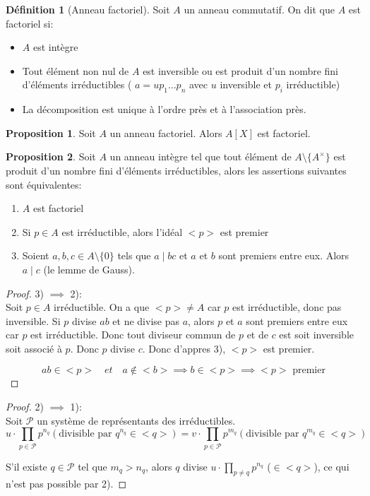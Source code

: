\documentclass{article}
\theoremstyle{definition}
\newtheorem{definition}{Définition}
\theoremstyle{definition}
\newtheorem{prop}{Proposition}
\theoremstyle{definition}
\theoremstyle{plain}
\theoremstyle{theorem}
\begin{document}
\begin{definition}[Anneau factoriel]
	Soit $A$ un anneau commutatif. On dit que $A$ est factoriel si:
	\begin{itemize}
		\item $A$ est intègre
		\item Tout élément non nul de $A$ est inversible ou est produit d'un nombre fini d'éléments irréductibles ( $a = u p_1 \dots p_n$ avec $u$ inversible et $p_i$ irréductible)
		\item La décomposition est unique à l'ordre près et à l'association près.
	\end{itemize}
\end{definition}

\begin{prop}
	Soit $A$ un anneau factoriel. Alors $A[X]$ est factoriel.
\end{prop}


\begin{prop}
	Soit $A$ un anneau intègre tel que tout élément de $A\setminus\{A^{\times}\}$ est produit d'un nombre fini d'éléments irréductibles, alors les assertions suivantes sont équivalentes:
	\begin{enumerate}
		\item $A$ est factoriel
		\item Si $p \in A$ est irréductible, alors l'idéal $<p>$ est premier
		\item Soient $a,b,c \in A\setminus\{0\}$ tels que $a \mid bc$ et $a$ et $b$ sont premiers entre eux. Alors $a \mid c$ (le lemme de Gauss).
	\end{enumerate}
\end{prop}

\begin{proof}

	3) $\implies$ 2):\\
	Soit $p \in A$ irréductible. On a que $<p> \neq A$ car $p$ est irréductible, donc pas inversible.
	Si $p$ divise $ab$ et ne divise pas $a$, alors $p$ et $a$ sont premiers entre eux car $p$ est irréductible.
	Donc tout diviseur commun de $p$ et de $c$ est soit inversible soit associé à $p$. Donc $p$ divise $c$.
	Donc d'appres 3), $<p>$ est premier.

	\[ ab \in <p>\quad  et \quad a \notin <b> \implies b \in <p> \implies <p> \text{ premier} \]

\end{proof}

\begin{proof}

    2) $\implies$ 1):\\
    Soit $\mathcal{P}$ un système de représentants des irréductibles. 
	\begin{equation*}
        u \cdot \prod_{p \in \mathcal{P}} p^{n_q} (\text{divisible par } q^{n_q} \in <q> ) = v \cdot \prod_{p \in \mathcal{P}} p^{m_q} (\text{divisible par } q^{m_q} \in <q>)
	\end{equation*}
	\noindent

    S'il existe $q \in \mathcal{P}$ tel que $m_q > n_q$, alors $q$ divise $u \cdot \prod_{p \ne q} p^{n_q}$ ($\in <q>$), ce qui n'est pas possible par 2).

\end{proof}
\end{document}

